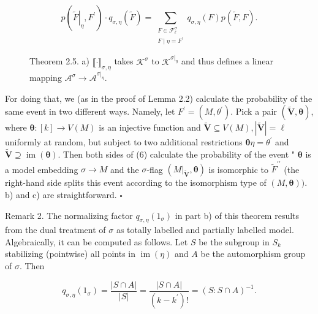 \documentclass[10pt]{article}
\begin{document}
\begin{figure}[h]
\begin{center}
\captionsetup{labelformat=empty}
\caption{Theorem 2.5. a) $\llbracket \cdot \rrbracket_{\sigma, \eta}$ takes $\mathcal{K}^{\sigma}$ to $\mathcal{K}^{\left.\sigma\right|_{\eta}}$ and thus defines a linear mapping $\mathcal{A}^{\sigma} \rightarrow \mathcal{A}^{\left.\sigma\right|_{\eta}}$.}

\begin{equation*}
p\left(\left.\widetilde{F}\right|_{\eta}, F^{\prime}\right) \cdot q_{\sigma, \eta}(\widetilde{F})=\sum_{\substack{F \in \mathcal{F}_{\ell}^{\sigma} \\ F \mid \eta=F^{\prime}}} q_{\sigma, \eta}(F) p(\widetilde{F}, F) . \tag{6}
\end{equation*}
\end{center}
\end{figure}

For doing that, we (as in the proof of Lemma 2.2) calculate the probability of the same event in two different ways. Namely, let $F^{\prime}=\left(M, \theta^{\prime}\right)$. Pick a pair $(\tilde{\boldsymbol{V}}, \boldsymbol{\theta})$, where $\boldsymbol{\theta}:[k] \longrightarrow V(M)$ is an injective function and $\tilde{\boldsymbol{V}} \subseteq V(M),|\widetilde{\boldsymbol{V}}|=\ell$ uniformly at random, but subject to two additional restrictions $\boldsymbol{\theta} \eta=\theta^{\prime}$ and $\widetilde{\boldsymbol{V}} \supseteq \operatorname{im}(\boldsymbol{\theta})$. Then both sides of (6) calculate the probability of the event " $\boldsymbol{\theta}$ is a model embedding $\sigma \longrightarrow M$ and the $\sigma$-flag $\left(\left.M\right|_{\tilde{\boldsymbol{V}}}, \boldsymbol{\theta}\right)$ is isomorphic to $\widetilde{F}^{\prime \prime}$ (the right-hand side splits this event according to the isomorphism type of $(M, \boldsymbol{\theta}))$.\\
b) and c) are straightforward. \(\square\)

Remark 2. The normalizing factor $q_{\sigma, \eta}\left(1_{\sigma}\right)$ in part b) of this theorem results from the dual treatment of $\sigma$ as totally labelled and partially labelled model. Algebraically, it can be computed as follows. Let $S$ be the subgroup in $S_{k}$ stabilizing (pointwise) all points in $\operatorname{im}(\eta)$ and $A$ be the automorphism group of $\sigma$. Then

$$
q_{\sigma, \eta}\left(1_{\sigma}\right)=\frac{|S \cap A|}{|S|}=\frac{|S \cap A|}{\left(k-k^{\prime}\right)!}=(S: S \cap A)^{-1} .
$$
\end{document}
